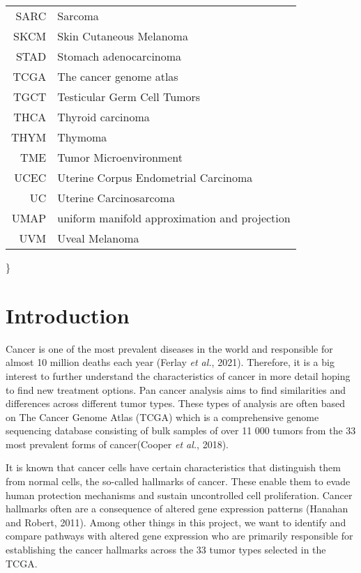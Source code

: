 \documentclass[
  parskip,
  oneside]{scrreprt}
\begin{document}
\begin{tabular}{rl}
      SARC & Sarcoma\\
      SKCM & Skin Cutaneous Melanoma\\
      STAD & Stomach adenocarcinoma\\
      TCGA & The cancer genome atlas\\
      TGCT & Testicular Germ Cell Tumors\\
      THCA & Thyroid carcinoma\\
      THYM & Thymoma\\
      TME & Tumor Microenvironment\\
      UCEC & Uterine Corpus Endometrial Carcinoma\\
      UC & Uterine Carcinosarcoma\\
      UMAP & uniform manifold approximation and projection\\
      UVM & Uveal Melanoma\\
        \end{tabular}

\}

\hypertarget{introduction}{%
\chapter{Introduction}\label{introduction}}

Cancer is one of the most prevalent diseases in the world and
responsible for almost 10 million deaths each year (Ferlay \emph{et
al.}, 2021). Therefore, it is a big interest to further understand the
characteristics of cancer in more detail hoping to find new treatment
options. Pan cancer analysis aims to find similarities and differences
across different tumor types. These types of analysis are often based on
The Cancer Genome Atlas (TCGA) which is a comprehensive genome
sequencing database consisting of bulk samples of over 11 000 tumors
from the 33 most prevalent forms of cancer(Cooper \emph{et al.}, 2018).

It is known that cancer cells have certain characteristics that
distinguish them from normal cells, the so-called hallmarks of cancer.
These enable them to evade human protection mechanisms and sustain
uncontrolled cell proliferation. Cancer hallmarks often are a
consequence of altered gene expression patterns (Hanahan and Robert,
2011). Among other things in this project, we want to identify and
compare pathways with altered gene expression who are primarily
responsible for establishing the cancer hallmarks across the 33 tumor
types selected in the TCGA.
\end{document}
